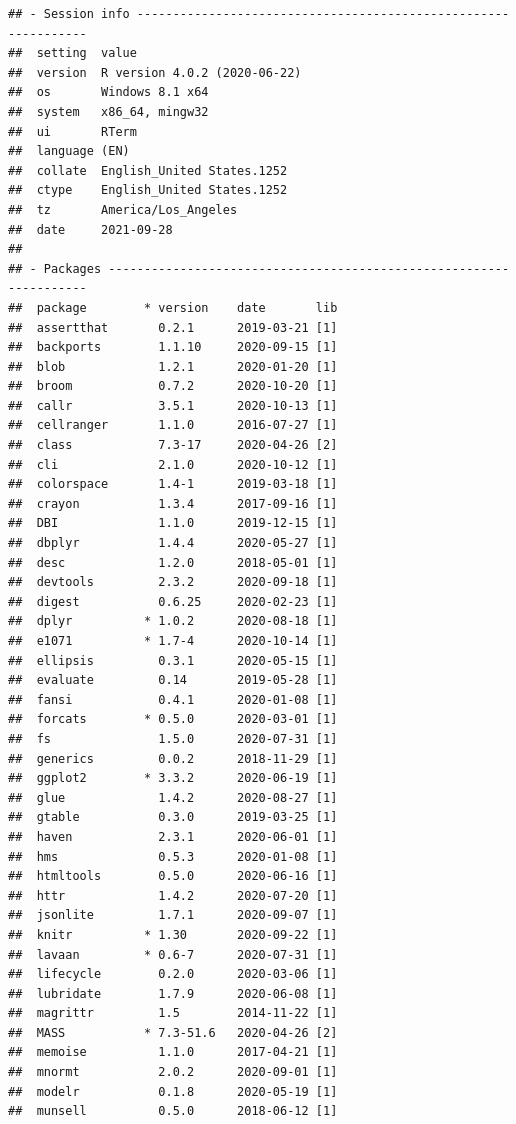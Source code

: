 \documentclass[10,a4paperpaper,]{article}
\begin{document}
\begin{verbatim}
## - Session info ---------------------------------------------------------------
##  setting  value                       
##  version  R version 4.0.2 (2020-06-22)
##  os       Windows 8.1 x64             
##  system   x86_64, mingw32             
##  ui       RTerm                       
##  language (EN)                        
##  collate  English_United States.1252  
##  ctype    English_United States.1252  
##  tz       America/Los_Angeles         
##  date     2021-09-28                  
## 
## - Packages -------------------------------------------------------------------
##  package        * version    date       lib
##  assertthat       0.2.1      2019-03-21 [1]
##  backports        1.1.10     2020-09-15 [1]
##  blob             1.2.1      2020-01-20 [1]
##  broom            0.7.2      2020-10-20 [1]
##  callr            3.5.1      2020-10-13 [1]
##  cellranger       1.1.0      2016-07-27 [1]
##  class            7.3-17     2020-04-26 [2]
##  cli              2.1.0      2020-10-12 [1]
##  colorspace       1.4-1      2019-03-18 [1]
##  crayon           1.3.4      2017-09-16 [1]
##  DBI              1.1.0      2019-12-15 [1]
##  dbplyr           1.4.4      2020-05-27 [1]
##  desc             1.2.0      2018-05-01 [1]
##  devtools         2.3.2      2020-09-18 [1]
##  digest           0.6.25     2020-02-23 [1]
##  dplyr          * 1.0.2      2020-08-18 [1]
##  e1071          * 1.7-4      2020-10-14 [1]
##  ellipsis         0.3.1      2020-05-15 [1]
##  evaluate         0.14       2019-05-28 [1]
##  fansi            0.4.1      2020-01-08 [1]
##  forcats        * 0.5.0      2020-03-01 [1]
##  fs               1.5.0      2020-07-31 [1]
##  generics         0.0.2      2018-11-29 [1]
##  ggplot2        * 3.3.2      2020-06-19 [1]
##  glue             1.4.2      2020-08-27 [1]
##  gtable           0.3.0      2019-03-25 [1]
##  haven            2.3.1      2020-06-01 [1]
##  hms              0.5.3      2020-01-08 [1]
##  htmltools        0.5.0      2020-06-16 [1]
##  httr             1.4.2      2020-07-20 [1]
##  jsonlite         1.7.1      2020-09-07 [1]
##  knitr          * 1.30       2020-09-22 [1]
##  lavaan         * 0.6-7      2020-07-31 [1]
##  lifecycle        0.2.0      2020-03-06 [1]
##  lubridate        1.7.9      2020-06-08 [1]
##  magrittr         1.5        2014-11-22 [1]
##  MASS           * 7.3-51.6   2020-04-26 [2]
##  memoise          1.1.0      2017-04-21 [1]
##  mnormt           2.0.2      2020-09-01 [1]
##  modelr           0.1.8      2020-05-19 [1]
##  munsell          0.5.0      2018-06-12 [1]

\end{verbatim}
\end{document}
